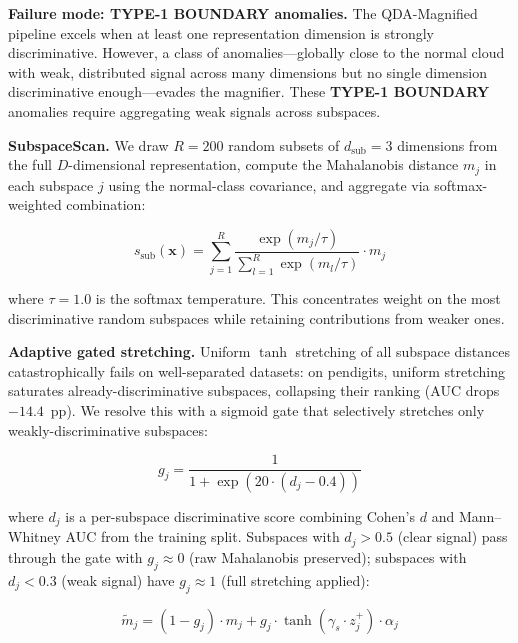 \documentclass[journal]{IEEEtran}
\begin{document}
\textbf{Failure mode: TYPE-1 BOUNDARY anomalies.} The QDA-Magnified pipeline excels when at least one representation dimension is strongly discriminative. However, a class of anomalies---globally close to the normal cloud with weak, distributed signal across many dimensions but no single dimension discriminative enough---evades the magnifier. These \textbf{TYPE-1 BOUNDARY} anomalies require aggregating weak signals across subspaces.

\textbf{SubspaceScan.} We draw $R = 200$ random subsets of $d_{\text{sub}} = 3$ dimensions from the full $D$-dimensional representation, compute the Mahalanobis distance $m_j$ in each subspace $j$ using the normal-class covariance, and aggregate via softmax-weighted combination:

\begin{equation}
s_{\text{sub}}(\mathbf{x}) = \sum_{j=1}^{R} \frac{\exp(m_j / \tau)}{\sum_{l=1}^R \exp(m_l / \tau)} \cdot m_j
\label{eq:softmax_agg}
\end{equation}

where $\tau = 1.0$ is the softmax temperature. This concentrates weight on the most discriminative random subspaces while retaining contributions from weaker ones.

\textbf{Adaptive gated stretching.} Uniform $\tanh$ stretching of all subspace distances catastrophically fails on well-separated datasets: on pendigits, uniform stretching saturates already-discriminative subspaces, collapsing their ranking (AUC drops $-14.4$~pp). We resolve this with a sigmoid gate that selectively stretches only weakly-discriminative subspaces:

\begin{equation}
g_j = \frac{1}{1 + \exp(20 \cdot (d_j - 0.4))}
\label{eq:gate}
\end{equation}

where $d_j$ is a per-subspace discriminative score combining Cohen's $d$ and Mann--Whitney AUC from the training split. Subspaces with $d_j > 0.5$ (clear signal) pass through the gate with $g_j \approx 0$ (raw Mahalanobis preserved); subspaces with $d_j < 0.3$ (weak signal) have $g_j \approx 1$ (full stretching applied):

\begin{equation}
\tilde{m}_j = (1 - g_j) \cdot m_j + g_j \cdot \tanh(\gamma_s \cdot z_j^{+}) \cdot \alpha_j
\label{eq:gated_stretch}
\end{equation}
\end{document}
